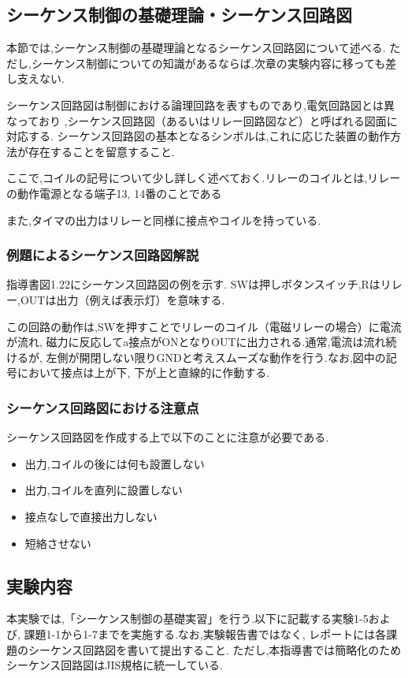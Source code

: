 \subsection{シーケンス制御の基礎理論・シーケンス回路図}

本節では,シーケンス制御の基礎理論となるシーケンス回路図について述べる.
ただし,シーケンス制御についての知識があるならば,次章の実験内容に移っても差し支えない.

シーケンス回路図は制御における論理回路を表すものであり,電気回路図とは異なっており
,シーケンス回路図（あるいはリレー回路図など）と呼ばれる図面に対応する.
シーケンス回路図の基本となるシンボルは,これに応じた装置の動作方法が存在することを留意すること.

ここで,コイルの記号について少し詳しく述べておく.リレーのコイルとは,リレーの動作電源となる端子13, 14番のことである

また,タイマの出力はリレーと同様に接点やコイルを持っている.

\subsubsection{例題によるシーケンス回路図解説}
指導書図1.22にシーケンス回路図の例を示す.
SWは押しボタンスイッチ,Rはリレー,OUTは出力（例えば表示灯）を意味する.

この回路の動作は,SWを押すことでリレーのコイル（電磁リレーの場合）に電流が流れ,
磁力に反応してa接点がONとなりOUTに出力される.通常,電流は流れ続けるが,
左側が開閉しない限りGNDと考えスムーズな動作を行う.なお,図中の記号において接点は上が下,
下が上と直線的に作動する.

\subsubsection{シーケンス回路図における注意点}
シーケンス回路図を作成する上で以下のことに注意が必要である.
\begin{itemize}
  \item 出力,コイルの後には何も設置しない
  \item 出力,コイルを直列に設置しない
  \item 接点なしで直接出力しない
  \item 短絡させない
\end{itemize}

\subsection{実験内容}

本実験では,「シーケンス制御の基礎実習」を行う.以下に記載する実験1-5および,
課題1-1から1-7までを実施する.なお,実験報告書ではなく,
レポートには各課題のシーケンス回路図を書いて提出すること.
ただし,本指導書では簡略化のためシーケンス回路図はJIS規格に統一している.

